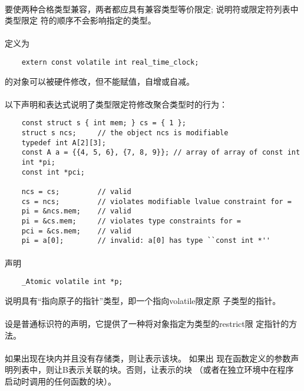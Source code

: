 {\paragraph{}
要使两种合格类型兼容，两者都应具有兼容类型等价限定; 说明符或限定符列表中类型限定
符的顺序不会影响指定的类型。

\paragraph{}
\ex 定义为
\begin{lstlisting}
    extern const volatile int real_time_clock;
\end{lstlisting}
的对象可以被硬件修改，但不能赋值，自增或自减。

\paragraph{}
\ex 以下声明和表达式说明了类型限定符修改聚合类型时的行为：
\begin{lstlisting}
    const struct s { int mem; } cs = { 1 };
    struct s ncs;     // the object ncs is modifiable
    typedef int A[2][3];
    const A a = {{4, 5, 6}, {7, 8, 9}}; // array of array of const int
    int *pi;
    const int *pci;

    ncs = cs;         // valid
    cs = ncs;         // violates modifiable lvalue constraint for =
    pi = &ncs.mem;    // valid
    pi = &cs.mem;     // violates type constraints for =
    pci = &cs.mem;    // valid
    pi = a[0];        // invalid: a[0] has type ``const int *''
\end{lstlisting}

\paragraph{}
\ex 声明
\begin{lstlisting}
    _Atomic volatile int *p;
\end{lstlisting}
说明具有``指向原子的指针''类型，即一个指向volatile限定原
子类型的指针。

\paragraph{}
设是普通标识符的声明，它提供了一种将对象指定为类型的restrict限
定指针的方法。

\paragraph{}
如果出现在块内并且没有存储类，则让表示该块。 如果出
现在函数定义的参数声明列表中，则让B表示关联的块。否则，让表示的块
（或者在独立环境中在程序启动时调用的任何函数的块）。

}
